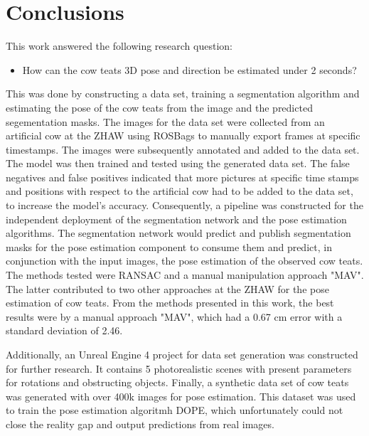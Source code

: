 \section{Conclusions}\label{sec:conclusions}
This work answered the following research question:
\begin{itemize}
    \item How can the cow teats 3D pose and direction be estimated under 2 seconds?
\end{itemize}
This was done by constructing a data set, training a segmentation algorithm and estimating the pose of the cow teats from the image and the predicted segementation masks. The images for the data set were collected from an artificial cow at the ZHAW using ROSBags to manually export frames at specific timestamps. The images were subsequently annotated and added to the data set. The model was then trained and tested using the generated data set. The false negatives and false positives indicated that more pictures at specific time stamps and positions with respect to the artificial cow had to be added to the data set, to increase the model's accuracy. Consequently, a pipeline was constructed for the independent deployment of the segmentation network and the pose estimation algorithms. The segmentation network would predict and publish segmentation masks for the pose estimation component to consume them and predict, in conjunction with the input images, the pose estimation of the observed cow teats. The methods tested were RANSAC and a manual manipulation approach "MAV". The latter contributed to two other approaches at the ZHAW for the pose estimation of cow teats. From the methods presented in this work, the best results were by a manual approach "MAV", which had a 0.67 cm error with a standard deviation of 2.46. 

Additionally, an Unreal Engine 4 project for data set generation was constructed for further research. It contains 5 photorealistic scenes with present parameters for rotations and obstructing objects. Finally, a synthetic data set of cow teats was generated with over 400k images for pose estimation. This dataset was used to train the pose estimation algoritmh DOPE, which unfortunately could not close the reality gap and output predictions from real images.

